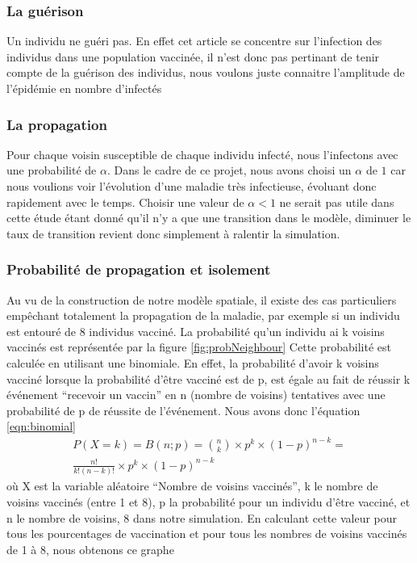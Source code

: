 \documentclass[journal, a4paper]{IEEEtran}
\begin{document}
	\subsubsection{La guérison}
	Un individu ne guéri pas. En effet cet article se concentre sur l'infection des individus dans une population vaccinée, il n'est donc pas pertinant de tenir compte de la guérison des individus, nous voulons juste connaitre l'amplitude de l'épidémie en nombre d'infectés
	\subsubsection{La propagation}
	Pour chaque voisin susceptible de chaque individu infecté, nous l'infectons avec une probabilité de $\alpha$. Dans le cadre de ce projet, nous avons choisi un $\alpha$ de $1$ car nous voulions voir l'évolution d'une maladie très infectieuse, évoluant donc rapidement avec le temps. Choisir une valeur de $\alpha < 1$ ne serait pas utile dans cette étude étant donné qu'il n'y a que une transition dans le modèle, diminuer le taux de transition revient donc simplement à ralentir la simulation.
	\subsubsection{Probabilité de propagation et isolement}
	Au vu de la construction de notre modèle spatiale, il existe des cas particuliers empêchant totalement la propagation de la maladie, par exemple si un individu est entouré de 8 individus vacciné.
	La probabilité qu'un individu ai k voisins vaccinés est représentée par la figure \ref{fig:probNeighbour}
	Cette probabilité est calculée en utilisant une binomiale. En effet, la probabilité d'avoir k voisins vacciné lorsque la probabilité d'être vacciné est de p, est égale au fait de réussir k événement ``recevoir un vaccin'' en n (nombre de voisins) tentatives avec une probabilité de p de réussite de l'événement. Nous avons donc l'équation \ref{eqn:binomial}
	\begin{equation}
		\label{eqn:binomial}
		\begin{aligned}
			P(X = k) = B(n;p) = {n \choose k}\times p^k \times (1-p)^{n-k} = \\ \frac{n!}{k!(n-k)!}\times p^k \times (1-p)^{n-k}
		\end{aligned}
	\end{equation}
	où X est la variable aléatoire ``Nombre de voisins vaccinés'', k le nombre de voisins vaccinés (entre 1 et 8), p la probabilité pour un individu d'être vacciné, et n le nombre de voisins, 8 dans notre simulation. En calculant cette valeur pour tous les pourcentages de vaccination et pour tous les nombres de voisins vaccinés de 1 à 8, nous obtenons ce graphe
\end{document}
